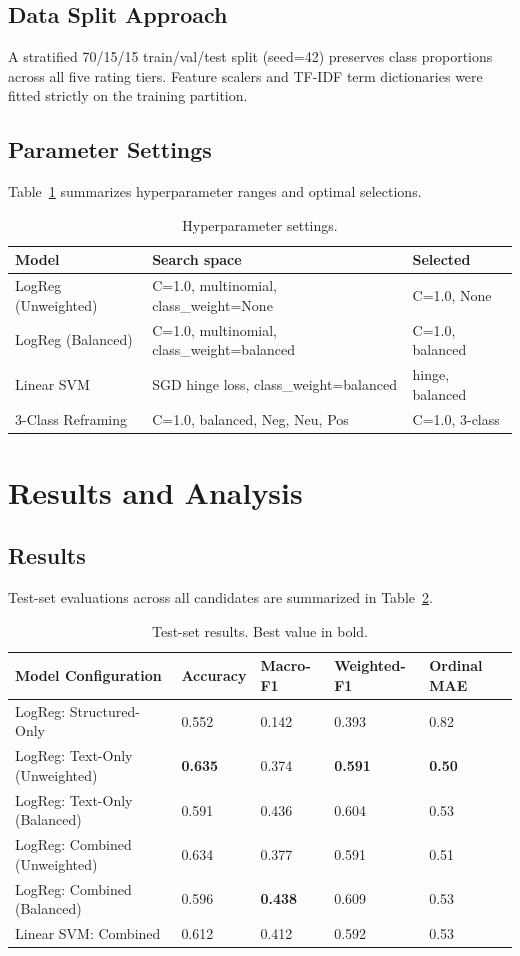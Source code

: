 \documentclass[conference]{IEEEtran}
\begin{document}
\subsection{Data Split Approach}
A stratified 70/15/15 train/val/test split (seed=42) preserves class proportions across all five rating tiers. Feature scalers and TF-IDF term dictionaries were fitted strictly on the training partition.

\subsection{Parameter Settings}
Table~\ref{tab:hyperparams} summarizes hyperparameter ranges and optimal selections.

\begin{table}[htbp]
\caption{Hyperparameter settings.}
\label{tab:hyperparams}
\centering
\begin{tabular}{lll}
\toprule
\textbf{Model} & \textbf{Search space} & \textbf{Selected} \\
\midrule
LogReg (Unweighted) & C=1.0, multinomial, class_weight=None & C=1.0, None \\
LogReg (Balanced) & C=1.0, multinomial, class_weight=balanced & C=1.0, balanced \\
Linear SVM & SGD hinge loss, class_weight=balanced & hinge, balanced \\
3-Class Reframing & C=1.0, balanced, {Neg, Neu, Pos} & C=1.0, 3-class \\
\bottomrule
\end{tabular}
\end{table}

\section{Results and Analysis}
\subsection{Results}
Test-set evaluations across all candidates are summarized in Table~\ref{tab:results}.

\begin{table}[htbp]
\caption{Test-set results. Best value in bold.}
\label{tab:results}
\centering
\begin{tabular}{lllll}
\toprule
\textbf{Model Configuration} & \textbf{Accuracy} & \textbf{Macro-F1} & \textbf{Weighted-F1} & \textbf{Ordinal MAE} \\
\midrule
LogReg: Structured-Only & 0.552 & 0.142 & 0.393 & 0.82 \\
LogReg: Text-Only (Unweighted) & \textbf{0.635} & 0.374 & \textbf{0.591} & \textbf{0.50} \\
LogReg: Text-Only (Balanced) & 0.591 & 0.436 & 0.604 & 0.53 \\
LogReg: Combined (Unweighted) & 0.634 & 0.377 & 0.591 & 0.51 \\
LogReg: Combined (Balanced) & 0.596 & \textbf{0.438} & 0.609 & 0.53 \\
Linear SVM: Combined & 0.612 & 0.412 & 0.592 & 0.53 \\
\bottomrule
\end{tabular}
\end{table}
\end{document}

